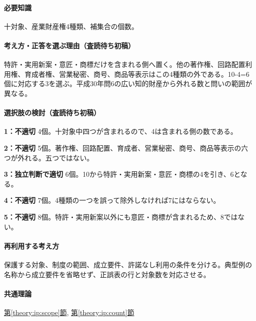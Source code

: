 \paragraph{必要知識} 十対象、産業財産権4種類、補集合の個数。

\paragraph{考え方・正答を選ぶ理由（査読待ち初稿）} 特許・実用新案・意匠・商標だけを含まれる側へ置く。他の著作権、回路配置利用権、育成者権、営業秘密、商号、商品等表示はこの4種類の外である。10-4=\allowbreak{}6個に対応する3を選ぶ。平成30年問6の広い知的財産から外れる数と問いの範囲が異なる。

\paragraph{選択肢の検討（査読待ち初稿）}\mbox{}\par

\noindent\textbf{1：不適切} 4個。十対象中四つが含まれるので、4は含まれる側の数である。\par

\noindent\textbf{2：不適切} 5個。著作権、回路配置、育成者、営業秘密、商号、商品等表示の六つが外れる。五つではない。\par

\noindent\textbf{3：独立判断で適切} 6個。10から特許・実用新案・意匠・商標の4を引き、6となる。\par

\noindent\textbf{4：不適切} 7個。4種類の一つを誤って除外しなければ7にはならない。\par

\noindent\textbf{5：不適切} 8個。特許・実用新案以外にも意匠・商標が含まれるため、8ではない。\par

\paragraph{再利用する考え方} 保護する対象、制度の範囲、成立要件、許諾なし利用の条件を分ける。典型例の名称から成立要件を省略せず、正誤表の行と対象数を対応させる。

\paragraph{共通理論} \hyperref[theory:ip:scope]{第\ref*{theory:ip:scope}節}, \hyperref[theory:ip:count]{第\ref*{theory:ip:count}節}

